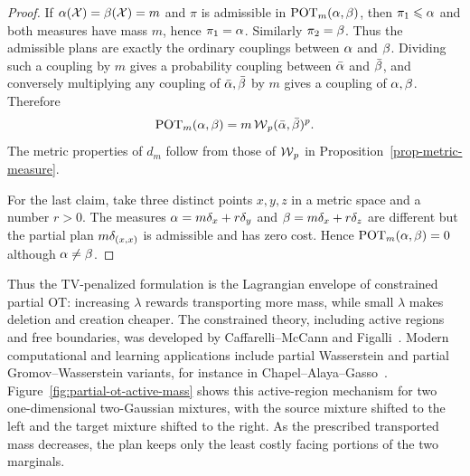 \begin{proof}
	If $\alpha(\mathcal{X})=\beta(\mathcal{X})=m$ and $\pi$ is admissible in $\operatorname{POT}_m(\alpha,\beta)$, then $\pi_1\leqslant\alpha$ and both measures have mass $m$, hence $\pi_1=\alpha$. Similarly $\pi_2=\beta$. Thus the admissible plans are exactly the ordinary couplings between $\alpha$ and $\beta$. Dividing such a coupling by $m$ gives a probability coupling between $\bar{\alpha}$ and $\bar{\beta}$, and conversely multiplying any coupling of $\bar{\alpha},\bar{\beta}$ by $m$ gives a coupling of $\alpha,\beta$. Therefore
	\[
		\operatorname{POT}_m(\alpha,\beta)
		=
		m\operatorname{\mathcal{W}}_p(\bar{\alpha},\bar{\beta})^p.
	\]
	The metric properties of $d_m$ follow from those of $\operatorname{\mathcal{W}}_p$ in Proposition~\ref{prop-metric-measure}.

	For the last claim, take three distinct points $x,y,z$ in a metric space and a number $r>0$. The measures $\alpha=m\delta_x+r\delta_y$ and $\beta=m\delta_x+r\delta_z$ are different but the partial plan $m\delta_{(x,x)}$ is admissible and has zero cost. Hence $\operatorname{POT}_m(\alpha,\beta)=0$ although $\alpha\neq\beta$.
\end{proof}

	Thus the TV-penalized formulation is the Lagrangian envelope of constrained partial OT: increasing $\lambda$ rewards transporting more mass, while small $\lambda$ makes deletion and creation cheaper. The constrained theory, including active regions and free boundaries, was developed by Caffarelli--McCann and Figalli~\cite{CaffarelliMcCannPartial,FigalliPartial}. Modern computational and learning applications include partial Wasserstein and partial Gromov--Wasserstein variants, for instance in Chapel--Alaya--Gasso~\cite{ChapelAlayaGassoPartial}.
	Figure~\ref{fig:partial-ot-active-mass} shows this active-region mechanism for two one-dimensional two-Gaussian mixtures, with the source mixture shifted to the left and the target mixture shifted to the right. As the prescribed transported mass decreases, the plan keeps only the least costly facing portions of the two marginals.


